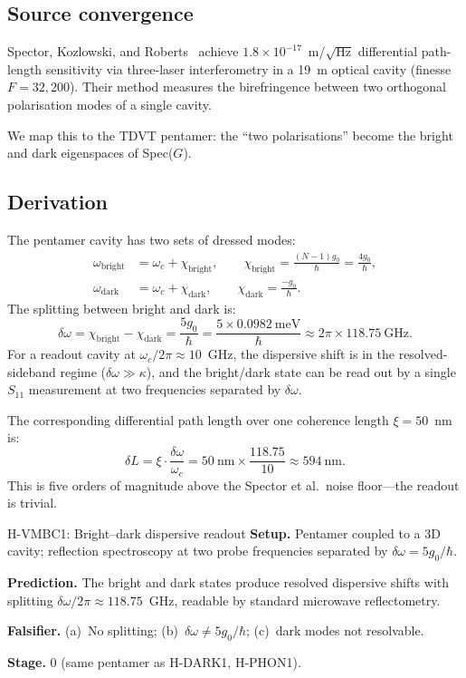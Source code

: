 \documentclass[11pt,letterpaper]{article}
\newcommand{\gzero}{g_0}
\begin{document}
\subsection{Source convergence}
Spector, Kozlowski, and Roberts~\cite{Spector2026} achieve $1.8 \times 10^{-17}$~m/$\sqrt{\text{Hz}}$ differential path-length sensitivity via three-laser interferometry in a 19~m optical cavity (finesse $F = 32{,}200$).  Their method measures the birefringence between two orthogonal polarisation modes of a single cavity.

We map this to the TDVT pentamer: the ``two polarisations'' become the bright and dark eigenspaces of Spec($G$).

\subsection{Derivation}
The pentamer cavity has two sets of dressed modes:
\begin{align}
  \omega_{\mathrm{bright}} &= \omega_c + \chi_{\mathrm{bright}}, \qquad \chi_{\mathrm{bright}} = \frac{(N{-}1)\gzero}{\hbar} = \frac{4\gzero}{\hbar}, \\
  \omega_{\mathrm{dark}} &= \omega_c + \chi_{\mathrm{dark}}, \qquad \chi_{\mathrm{dark}} = \frac{-\gzero}{\hbar}.
\end{align}
The splitting between bright and dark is:
\begin{equation}\label{eq:splitting}
  \delta\omega = \chi_{\mathrm{bright}} - \chi_{\mathrm{dark}} = \frac{5\gzero}{\hbar} = \frac{5 \times 0.0982~\text{meV}}{\hbar} \approx 2\pi \times 118.75~\text{GHz}.
\end{equation}
For a readout cavity at $\omega_c/2\pi \approx 10$~GHz, the dispersive shift is in the resolved-sideband regime ($\delta\omega \gg \kappa$), and the bright/dark state can be read out by a single $S_{11}$ measurement at two frequencies separated by $\delta\omega$.

The corresponding differential path length over one coherence length $\xi = 50$~nm is:
\begin{equation}
  \delta L = \xi \cdot \frac{\delta\omega}{\omega_c} = 50~\text{nm} \times \frac{118.75}{10} \approx 594~\text{nm}.
\end{equation}
This is five orders of magnitude above the Spector et al.\ noise floor---the readout is trivial.

\begin{hypothesis}{H-VMBC1: Bright--dark dispersive readout}
\textbf{Setup.}  Pentamer coupled to a 3D cavity; reflection spectroscopy at two probe frequencies separated by $\delta\omega = 5\gzero/\hbar$.

\textbf{Prediction.}  The bright and dark states produce resolved dispersive shifts with splitting $\delta\omega/2\pi \approx 118.75$~GHz, readable by standard microwave reflectometry.

\textbf{Falsifier.}  (a)~No splitting; (b)~$\delta\omega \neq 5\gzero/\hbar$; (c)~dark modes not resolvable.

\textbf{Stage.}  0 (same pentamer as H-DARK1, H-PHON1).
\end{hypothesis}
\end{document}

